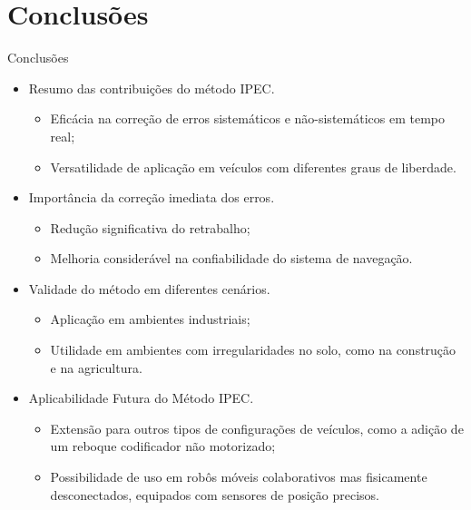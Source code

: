 \documentclass[xcolor=dvipsnames, aspectratio=169]{beamer}
\begin{document}
\section{Conclusões}
\begin{frame}{Conclusões}
  \begin{itemize}
    \item Resumo das contribuições do método IPEC.
      \begin{itemize}
        \item Eficácia na correção de erros sistemáticos e não-sistemáticos em tempo real;
        \item Versatilidade de aplicação em veículos com diferentes graus de liberdade.
      \end{itemize}
    \item Importância da correção imediata dos erros.
      \begin{itemize}
        \item Redução significativa do retrabalho;
        \item Melhoria considerável na confiabilidade do sistema de navegação.
      \end{itemize}
    \item Validade do método em diferentes cenários.
      \begin{itemize}
        \item Aplicação em ambientes industriais;
        \item Utilidade em ambientes com irregularidades no solo, como na construção e na agricultura.
      \end{itemize}
    \item Aplicabilidade Futura do Método IPEC.
      \begin{itemize}
        \item Extensão para outros tipos de configurações de veículos, como a adição de um reboque codificador não motorizado;
        \item Possibilidade de uso em robôs móveis colaborativos mas fisicamente desconectados, equipados com sensores de posição precisos.
      \end{itemize}
  \end{itemize}
\end{frame}



\begin{frame}
    \printbibliography
\end{frame}


\begin{frame}
\titlepage %
\end{frame}
\end{document}
